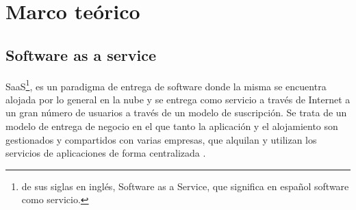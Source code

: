 \section{Marco teórico}





\subsection{Software as a service}
SaaS\footnote{de sus siglas en inglés, Software as a Service, que significa en español software como servicio.}, es un paradigma de entrega de software donde la misma se encuentra alojada por lo general en la nube y se entrega como servicio a través de Internet a un gran número de usuarios a través de un modelo de suscripción. Se trata de un modelo de entrega de negocio en el que tanto la aplicación y el alojamiento son gestionados y compartidos con varias empresas, que alquilan y utilizan los servicios de aplicaciones de forma centralizada \citep{gupta_software_2014}.

